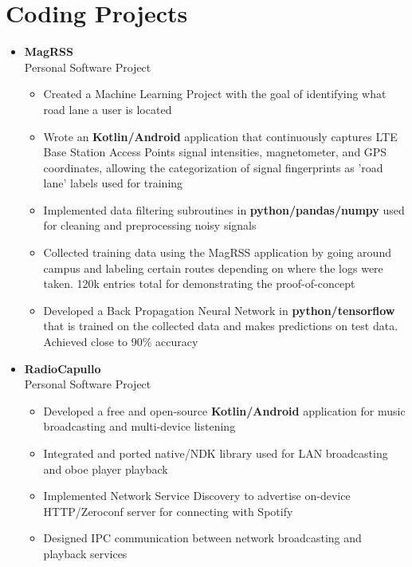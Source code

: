 \section{\sectionheading Coding Projects}

\begin{itemize}[leftmargin=0pt, label={}]%

\item{
{\sectionheading\large{\textbf{MagRSS}}}\\%
{\sectionheading\small{Personal Software Project}}\hfill

    \vspace{-6pt}
    \begin{itemize}[label=\textbullet, leftmargin=*, noitemsep]%
        \item{Created a Machine Learning Project with the goal of identifying what road lane a user is located}
        \item{Wrote an \textbf{Kotlin/Android} application that continuously captures LTE Base Station Access Points signal intensities, magnetometer, and GPS coordinates, allowing the categorization of signal fingerprints as 'road lane' labels used for training}
        \item{Implemented data filtering subroutines in \textbf{python/pandas/numpy} used for cleaning and preprocessing noisy signals}
        \item{Collected training data using the MagRSS application by going around campus and labeling certain routes depending on where the logs were taken. 120k entries total for demonstrating the proof-of-concept}
        \item{Developed a Back Propagation Neural Network in \textbf{python/tensorflow} that is trained on the collected data and makes predictions on test data. Achieved close to 90\% accuracy}
    \end{itemize}
}

\item{
{\sectionheading\large{\textbf{RadioCapullo}}}\\%
{\sectionheading\small{Personal Software Project}}\hfill

    \vspace{-6pt}
    \begin{itemize}[label=\textbullet, leftmargin=*, noitemsep]%
        \item{Developed a free and open-source \textbf{Kotlin/Android} application for music broadcasting and multi-device listening}
        \item{Integrated and ported native/NDK library used for LAN broadcasting and oboe player playback}
        \item{Implemented Network Service Discovery to advertise on-device HTTP/Zeroconf server for connecting with Spotify}
        \item{Designed IPC communication between network broadcasting and playback services}
    \end{itemize}
}


\end{itemize}
